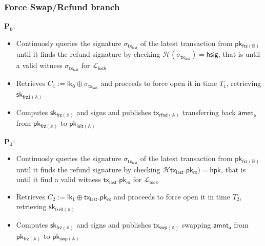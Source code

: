 \documentclass{article}      	%
\begin{document}
\subsubsection*{Force Swap/Refund branch}
\: $\mathbf{P_0:}$
\begin{itemize}
    \item Continuosly queries the signature $\sigma_{\mathsf{tx_{last}}}$ of the latest transaction from $\mathsf{pk_{frz(\mathbb{B})}}$ until it finds the refund signature by checking $\mathcal{H}(\sigma_{\mathsf{tx_{last}}}) = \mathsf{hsig}$, that is until a valid witness $\sigma_{\mathsf{tx_{last}}}$ for $\mathcal{L}_{\mathsf{lock}}$
    \item Retrieves $C_1 := \mathsf{lk_0} \oplus \sigma_{\mathsf{tx_{last}}}$ and proceeds to force open it in time $T_1$, retrieving $\mathsf{sk_{frz1(\mathbb{A})}}$
    \item Computes $\mathsf{sk_{frz(\mathbb{A})}}$ and signs and publishes $\mathsf{tx_{rfnd(\mathbb{A})}}$ transferring back $\mathsf{amnt_a}$ from $\mathsf{pk_{frz(\mathbb{A})}}$ to $\mathsf{pk_{init(\mathbb{A})}}$
\end{itemize}
\: $\mathbf{P_1:}$
\begin{itemize}
    \item Continuosly queries the signature $\sigma_{\mathsf{tx_{last}}}$ of the latest transaction from $\mathsf{pk_{frz(\mathbb{B})}}$ until it finds the refund signature by checking $\mathcal{H}{\mathsf{tx_{last}}.\mathsf{pk_{rx}}}) = \mathsf{hpk}$, that is until it find a valid witness $\mathsf{tx_{last}}.\mathsf{pk_{rx}}$ for $\mathcal{L}_{\mathsf{lock}}$
    \item Retrieves $C_2 := \mathsf{lk_1} \oplus \mathsf{tx_{last}}.\mathsf{pk_{rx}}$ and proceeds to force open it in time $T_2$, retrieving $\mathsf{sk_{frz0(\mathbb{A})}}$
    \item Computes $\mathsf{sk_{frz(\mathbb{A})}}$ and signs and publishes $\mathsf{tx_{swp(\mathbb{A})}}$ swapping $\mathsf{amnt_a}$ from $\mathsf{pk_{frz(\mathbb{A})}}$ to $\mathsf{pk_{swp(\mathbb{A})}}$
\end{itemize}
\end{document}
